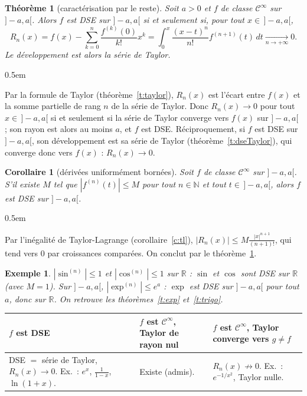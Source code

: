 \documentclass[a4paper,11pt]{article}
\makeatletter
\numberwithin{equation}{section}
\numberwithin{figure}{section}
\numberwithin{table}{section}
\theoremstyle{enonce}
\newtheorem{theoreme}[definition]{Théorème}
\newtheorem{corollaire}[definition]{Corollaire}
\theoremstyle{exemple}
\newtheorem{exemple}[definition]{Exemple}
\theoremstyle{remarque}
\renewcommand{\proofname}{Démonstration}
\renewenvironment{proof}[1][\proofname]{\par\pushQED{\qed}\normalfont
  \topsep0.5em\relax\trivlist\item[\hskip\labelsep\sffamily\itshape\color{Gris}#1.]\ignorespaces}
  {\popQED\endtrivlist\@endpefalse}
\newcommand{\R}{\mathbb{R}}
\newcommand{\N}{\mathbb{N}}
\makeatother
\begin{document}
\begin{theoreme}[caractérisation par le reste]\label{t:caracDSE}
Soit $a>0$ et $f$ de classe $\mathcal C^\infty$ sur $]-a,a[$. Alors $f$ est DSE sur $]-a,a[$ si et seulement si, pour tout
$x\in\,]-a,a[$,
\[R_n(x)=f(x)-\sum_{k=0}^n\frac{f^{(k)}(0)}{k!}x^k=\int_0^x\frac{(x-t)^n}{n!}f^{(n+1)}(t)\,dt\xrightarrow[n\to+\infty]{}0.\]
Le développement est alors la série de Taylor.
\end{theoreme}

\begin{proof}
Par la formule de Taylor (théorème~\ref{t:taylor}), $R_n(x)$ est l'écart entre $f(x)$ et la somme partielle de rang $n$ de la
série de Taylor. Donc $R_n(x)\to0$ pour tout $x\in\,]-a,a[$ si et seulement si la série de Taylor converge vers $f(x)$ sur
$]-a,a[$ ; son rayon est alors au moins $a$, et $f$ est DSE. Réciproquement, si $f$ est DSE sur $]-a,a[$, son développement
est sa série de Taylor (théorème~\ref{t:dseTaylor}), qui converge donc vers $f(x)$ : $R_n(x)\to0$.
\end{proof}

\begin{corollaire}[dérivées uniformément bornées]\label{c:bornees}
Soit $f$ de classe $\mathcal C^\infty$ sur $]-a,a[$. S'il existe $M$ tel que $|f^{(n)}(t)|\leq M$ pour tout $n\in\N$ et tout
$t\in\,]-a,a[$, alors $f$ est DSE sur $]-a,a[$.
\end{corollaire}

\begin{proof}
Par l'inégalité de Taylor-Lagrange (corollaire~\ref{c:tl}), $|R_n(x)|\leq M\frac{|x|^{n+1}}{(n+1)!}$, qui tend vers $0$ par
croissances comparées. On conclut par le théorème~\ref{t:caracDSE}.
\end{proof}

\begin{exemple}
$|\sin^{(n)}|\leq1$ et $|\cos^{(n)}|\leq1$ sur $\R$ : $\sin$ et $\cos$ sont DSE sur $\R$ (avec $M=1$). Sur $]-a,a[$,
$|\exp^{(n)}|\leq e^a$ : $\exp$ est DSE sur $]-a,a[$ pour tout $a$, donc sur $\R$. On retrouve les théorèmes~\ref{t:exp}
et~\ref{t:trigo}.
\end{exemple}

{\centering\small\renewcommand{\arraystretch}{1.3}
\begin{tabular}{@{}p{4.6cm}p{4.2cm}p{4.6cm}@{}}
\toprule
\textbf{$f$ est DSE} & \textbf{$f$ est $\mathcal C^\infty$, Taylor de rayon nul} & \textbf{$f$ est $\mathcal C^\infty$, Taylor converge vers $g\neq f$}\\\midrule
DSE $=$ série de Taylor, $R_n(x)\to0$. Ex.~: $e^x$, $\frac1{1-x}$, $\ln(1+x)$. & Existe (admis). & $R_n(x)\not\to0$. Ex.~: $e^{-1/x^2}$, Taylor nulle.\\
\bottomrule
\end{tabular}\par}
\end{document}
